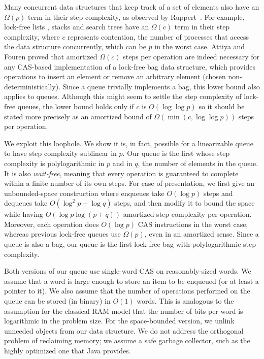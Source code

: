 Many concurrent data structures that keep track of a set of elements also have an $\Omega(p)$ term in their step complexity, as observed by Ruppert~\cite{Rup16}.
For example, lock-free lists \cite{FR04,Sha15}, stacks \cite{Tre86} and search trees \cite{EFHR14} 
have an $\Omega(c)$ term in their step complexity, where $c$ represents contention,
the number of processes that access the data structure concurrently, which can be $p$ in the worst case.
Attiya and Fouren \cite{DBLP:conf/opodis/AttiyaF17} proved 
that amortized $\Omega(c)$ steps per operation are indeed necessary
for any CAS-based implementation of a lock-free bag data structure, which provides operations
to insert an element or remove an arbitrary element (chosen non-deterministically).
Since a queue trivially implements a bag, this lower bound also applies to queues.
Although this might seem to settle the step complexity of lock-free queues, the lower bound
holds only if $c$ is $O(\log\log p)$ so it should be stated more precisely as
an amortized bound of $\Omega(\min(c,\log\log p))$ steps per operation.

We exploit this loophole.  We show  it is, in fact, possible for a linearizable queue
to have step complexity sublinear in $p$.
Our queue is the first whose step complexity  is polylogarithmic in $p$ and in $q$, the number of elements in the queue.
It is also \emph{wait-free}, meaning that every operation is guaranteed to complete within a finite number of its own steps.
For ease of presentation, we first give an unbounded-space construction where enqueues take $O(\log p)$ steps and
dequeues take $O(\log^2 p + \log q)$ steps,
and then modify it to bound the space
while  having $O(\log p\log( p+ q))$ amortized step complexity  per operation.
Moreover,  each operation does $O(\log p)$ CAS instructions in the worst case, whereas previous
lock-free queues use 
$\Omega(p)$, even in an amortized sense.
Since a queue is also a bag, our queue is the first lock-free bag  with polylogarithmic step complexity.

Both versions of our queue use single-word CAS on reasonably-sized 
words.
We assume that a word is large enough to store an item to be enqueued (or at least a pointer to it).  We also assume that the number of operations performed on the queue can be stored (in binary) in $O(1)$ words.
This is analogous to the assumption for the classical RAM model that the number of bits per word is logarithmic in the problem size.
For the space-bounded version, we unlink unneeded objects from our data structure.
We do not address the orthogonal problem of reclaiming memory; we assume a safe
garbage collector, such as the highly optimized one that Java provides.

